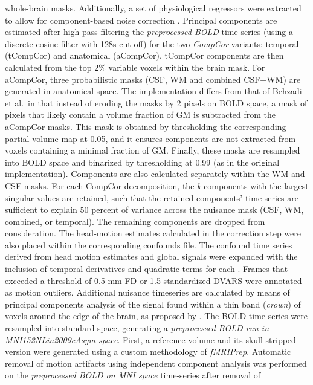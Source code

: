 \documentclass[
]{article}
\begin{document}
\begin{description}
whole-brain masks. Additionally, a set of physiological regressors were
extracted to allow for component-based noise correction
\citep[\emph{CompCor},][]{compcor}. Principal components are estimated
after high-pass filtering the \emph{preprocessed BOLD} time-series
(using a discrete cosine filter with 128s cut-off) for the two
\emph{CompCor} variants: temporal (tCompCor) and anatomical (aCompCor).
tCompCor components are then calculated from the top 2\% variable voxels
within the brain mask. For aCompCor, three probabilistic masks (CSF, WM
and combined CSF+WM) are generated in anatomical space. The
implementation differs from that of Behzadi et al.~in that instead of
eroding the masks by 2 pixels on BOLD space, a mask of pixels that
likely contain a volume fraction of GM is subtracted from the aCompCor
masks. This mask is obtained by thresholding the corresponding partial
volume map at 0.05, and it ensures components are not extracted from
voxels containing a minimal fraction of GM. Finally, these masks are
resampled into BOLD space and binarized by thresholding at 0.99 (as in
the original implementation). Components are also calculated separately
within the WM and CSF masks. For each CompCor decomposition, the
\emph{k} components with the largest singular values are retained, such
that the retained components' time series are sufficient to explain 50
percent of variance across the nuisance mask (CSF, WM, combined, or
temporal). The remaining components are dropped from consideration. The
head-motion estimates calculated in the correction step were also placed
within the corresponding confounds file. The confound time series
derived from head motion estimates and global signals were expanded with
the inclusion of temporal derivatives and quadratic terms for each
\citep{confounds_satterthwaite_2013}. Frames that exceeded a threshold
of 0.5 mm FD or 1.5 standardized DVARS were annotated as motion
outliers. Additional nuisance timeseries are calculated by means of
principal components analysis of the signal found within a thin band
(\emph{crown}) of voxels around the edge of the brain, as proposed by
\citep{patriat_improved_2017}. The BOLD time-series were resampled into
standard space, generating a \emph{preprocessed BOLD run in
MNI152NLin2009cAsym space}. First, a reference volume and its
skull-stripped version were generated using a custom methodology of
\emph{fMRIPrep}. Automatic removal of motion artifacts using independent
component analysis \citep[ICA-AROMA,][]{aroma} was performed on the
\emph{preprocessed BOLD on MNI space} time-series after removal of

\end{description}
\end{document}
